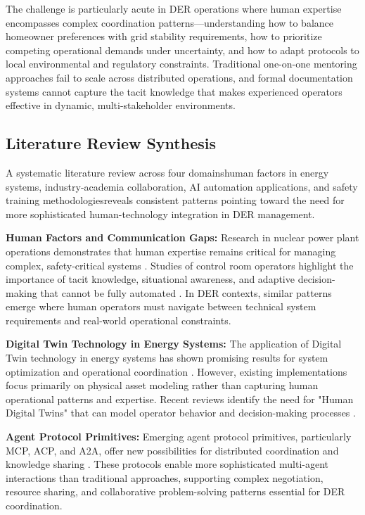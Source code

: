 \documentclass[12pt,a4paper]{article}
\newcommand{\emdash}{\textemdash}
\begin{document}
The challenge is particularly acute in DER operations where human expertise encompasses complex coordination patterns—understanding how to balance homeowner preferences with grid stability requirements, how to prioritize competing operational demands under uncertainty, and how to adapt protocols to local environmental and regulatory constraints. Traditional one-on-one mentoring approaches fail to scale across distributed operations, and formal documentation systems cannot capture the tacit knowledge that makes experienced operators effective in dynamic, multi-stakeholder environments.

\subsection{Literature Review Synthesis}

A systematic literature review across four domains\emdash{}human factors in energy systems, industry-academia collaboration, AI automation applications, and safety training methodologies\emdash{}reveals consistent patterns pointing toward the need for more sophisticated human-technology integration in DER management.

\textbf{Human Factors and Communication Gaps:} Research in nuclear power plant operations demonstrates that human expertise remains critical for managing complex, safety-critical systems \cite{10.1108/13552510610654510}. Studies of control room operators highlight the importance of tacit knowledge, situational awareness, and adaptive decision-making that cannot be fully automated \cite{10.1049/OAP-CIRED.2017.1107}. In DER contexts, similar patterns emerge where human operators must navigate between technical system requirements and real-world operational constraints.

\textbf{Digital Twin Technology in Energy Systems:} The application of Digital Twin technology in energy systems has shown promising results for system optimization and operational coordination \cite{10.1016/j.esr.2024.101334}. However, existing implementations focus primarily on physical asset modeling rather than capturing human operational patterns and expertise. Recent reviews identify the need for "Human Digital Twins" that can model operator behavior and decision-making processes \cite{10.1109/ETFA61755.2024.10711109}.

\textbf{Agent Protocol Primitives:} Emerging agent protocol primitives, particularly MCP, ACP, and A2A, offer new possibilities for distributed coordination and knowledge sharing \cite{10.5220/0001894702000205}. These protocols enable more sophisticated multi-agent interactions than traditional approaches, supporting complex negotiation, resource sharing, and collaborative problem-solving patterns essential for DER coordination.
\end{document}
